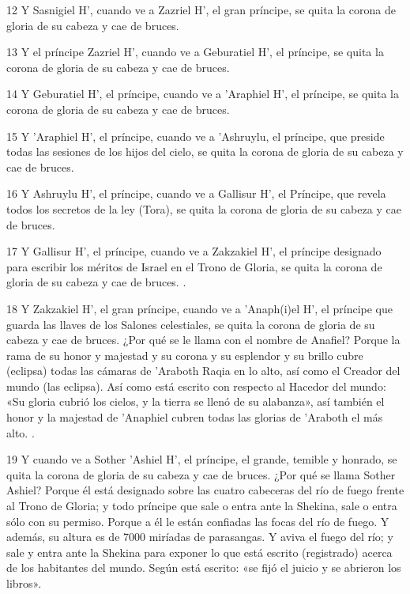 \par 12 Y Sasnigiel H', cuando ve a Zazriel H', el gran príncipe, se quita la corona de gloria de su cabeza y cae de bruces.

\par 13 Y el príncipe Zazriel H', cuando ve a Geburatiel H', el príncipe, se quita la corona de gloria de su cabeza y cae de bruces.

\par 14 Y Geburatiel H', el príncipe, cuando ve a 'Araphiel H', el príncipe, se quita la corona de gloria de su cabeza y cae de bruces.

\par 15 Y 'Araphiel H', el príncipe, cuando ve a 'Ashruylu, el príncipe, que preside todas las sesiones de los hijos del cielo, se quita la corona de gloria de su cabeza y cae de bruces.

\par 16 Y Ashruylu H', el príncipe, cuando ve a Gallisur H', el Príncipe, que revela todos los secretos de la ley (Tora), se quita la corona de gloria de su cabeza y cae de bruces.

\par 17 Y Gallisur H', el príncipe, cuando ve a Zakzakiel H', el príncipe designado para escribir los méritos de Israel en el Trono de Gloria, se quita la corona de gloria de su cabeza y cae de bruces. .

\par 18 Y Zakzakiel H', el gran príncipe, cuando ve a 'Anaph(i)el H', el príncipe que guarda las llaves de los Salones celestiales, se quita la corona de gloria de su cabeza y cae de bruces. ¿Por qué se le llama con el nombre de Anafiel? Porque la rama de su honor y majestad y su corona y su esplendor y su brillo cubre (eclipsa) todas las cámaras de 'Araboth Raqia en lo alto, así como el Creador del mundo (las eclipsa). Así como está escrito con respecto al Hacedor del mundo: «Su gloria cubrió los cielos, y la tierra se llenó de su alabanza», así también el honor y la majestad de 'Anaphiel cubren todas las glorias de 'Araboth el más alto. .

\par 19 Y cuando ve a Sother 'Ashiel H', el príncipe, el grande, temible y honrado, se quita la corona de gloria de su cabeza y cae de bruces. ¿Por qué se llama Sother Ashiel? Porque él está designado sobre las cuatro cabeceras del río de fuego frente al Trono de Gloria; y todo príncipe que sale o entra ante la Shekina, sale o entra sólo con su permiso. Porque a él le están confiadas las focas del río de fuego. Y además, su altura es de 7000 miríadas de parasangas. Y aviva el fuego del río; y sale y entra ante la Shekina para exponer lo que está escrito (registrado) acerca de los habitantes del mundo. Según está escrito: «se fijó el juicio y se abrieron los libros».

